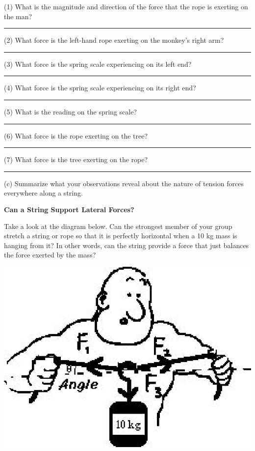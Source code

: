 (1) What is the magnitude and direction of the force that the rope is exerting
on the man? \rule{1.0in}{0.1pt}

(2) What force is the left-hand rope exerting on the monkey's right arm? \rule{1.0in}{0.1pt}

(3) What force is the spring scale experiencing on its left end? \rule{1.0in}{0.1pt}

(4) What force is the spring scale experiencing on its right end? \rule{1.0in}{0.1pt}

(5) What is the reading on the spring scale? \rule{1.0in}{0.1pt}

(6) What force is the rope exerting on the tree? \rule{1.0in}{0.1pt}

(7) What force is the tree exerting on the rope? \rule{1.0in}{0.1pt}

(c) Summarize what your observations reveal about the nature of tension forces
everywhere along a string.
\vspace{20mm}

\textbf{Can a String Support Lateral Forces? }

Take a look at the diagram below. Can the strongest member of your group stretch
a string or rope so that it is perfectly horizontal when a 10 kg mass is hanging
from it? In other words, can the string provide a force that just balances the
force exerted by the mass?

\vspace{0.3cm}
{\par\centering \includegraphics{newton/newton_fig7.eps} \par}
\vspace{0.3cm}

